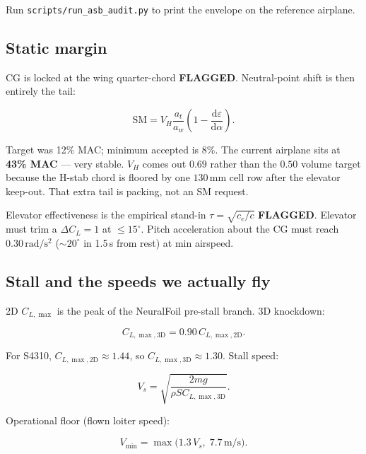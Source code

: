 \documentclass[11pt,letterpaper]{article}
\newcommand{\flag}{\textcolor{red!60!black}{\textbf{FLAGGED}}}
\newcommand{\code}[1]{\texttt{#1}}
\begin{document}
Run \code{scripts/run\_asb\_audit.py} to print the envelope on the reference airplane.

\subsection{Static margin}

CG is locked at the wing quarter-chord \flag{}. Neutral-point shift is then entirely the tail:

\begin{equation}
  \mathrm{SM}
    = V_H \frac{a_t}{a_w}
      \left(1 - \frac{\mathrm{d}\varepsilon}{\mathrm{d}\alpha}\right).
\end{equation}

Target was 12\% MAC; minimum accepted is 8\%. The current airplane sits at \textbf{43\% MAC} --- very stable. $V_H$ comes out $0.69$ rather than the $0.50$ volume target because the H-stab chord is floored by one $130\,\mathrm{mm}$ cell row after the elevator keep-out. That extra tail is packing, not an SM request.

Elevator effectiveness is the empirical stand-in $\tau = \sqrt{c_e/c}$ \flag{}. Elevator must trim a $\Delta C_L = 1$ at $\le 15^\circ$. Pitch acceleration about the CG must reach $0.30\,\mathrm{rad/s^2}$ ($\sim 20^\circ$ in 1.5\,s from rest) at min airspeed.

\subsection{Stall and the speeds we actually fly}

2D $C_{L,\max}$ is the peak of the NeuralFoil pre-stall branch. 3D knockdown:

\begin{equation}
  C_{L,\max,3\mathrm{D}} = 0.90\, C_{L,\max,2\mathrm{D}}.
\end{equation}

For S4310, $C_{L,\max,2\mathrm{D}} \approx 1.44$, so $C_{L,\max,3\mathrm{D}} \approx 1.30$. Stall speed:

\begin{equation}
  V_s = \sqrt{\frac{2mg}{\rho S C_{L,\max,3\mathrm{D}}}}.
\end{equation}

Operational floor (flown loiter speed):

\begin{equation}
  V_{\min} = \max\bigl(1.3\, V_s,\; 7.7\,\mathrm{m/s}\bigr).
\end{equation}
\end{document}
